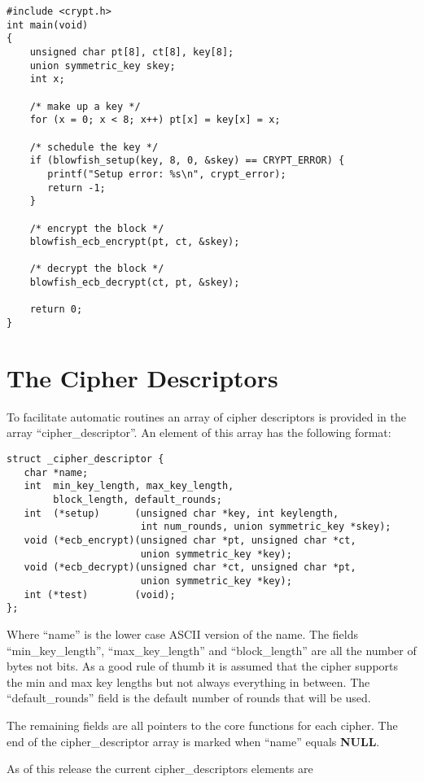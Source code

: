\documentclass{book}
\begin{document}
\begin{verbatim}
#include <crypt.h>
int main(void)
{ 
    unsigned char pt[8], ct[8], key[8];
    union symmetric_key skey;
    int x;

    /* make up a key */
    for (x = 0; x < 8; x++) pt[x] = key[x] = x;

    /* schedule the key */
    if (blowfish_setup(key, 8, 0, &skey) == CRYPT_ERROR) {
       printf("Setup error: %s\n", crypt_error);
       return -1;
    }    

    /* encrypt the block */
    blowfish_ecb_encrypt(pt, ct, &skey);
 
    /* decrypt the block */
    blowfish_ecb_decrypt(ct, pt, &skey);

    return 0;
}
\end{verbatim}

\section{The Cipher Descriptors}

To facilitate automatic routines an array of cipher descriptors is provided in the array ``cipher\_descriptor''.  An element
of this array has the following format:

\begin{verbatim}
struct _cipher_descriptor {
   char *name;
   int  min_key_length, max_key_length, 
        block_length, default_rounds;
   int  (*setup)      (unsigned char *key, int keylength, 
                       int num_rounds, union symmetric_key *skey);
   void (*ecb_encrypt)(unsigned char *pt, unsigned char *ct, 
                       union symmetric_key *key);
   void (*ecb_decrypt)(unsigned char *ct, unsigned char *pt, 
                       union symmetric_key *key);
   int (*test)        (void);
};
\end{verbatim}

Where ``name'' is the lower case ASCII version of the name.  The fields ``min\_key\_length'', ``max\_key\_length'' and
``block\_length'' are all the number of bytes not bits.  As a good rule of thumb it is assumed that the cipher supports
the min and max key lengths but not always everything in between.  The ``default\_rounds'' field is the default number
of rounds that will be used.

The remaining fields are all pointers to the core functions for each cipher.  The end of the cipher\_descriptor array is
marked when ``name'' equals {\bf NULL}.

As of this release the current cipher\_descriptors elements are
\end{document}
